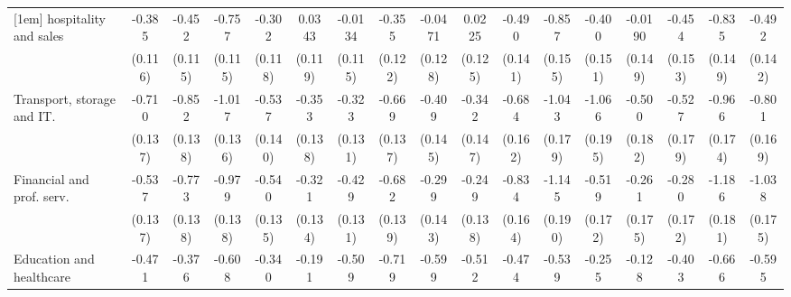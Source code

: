 {\begin{tabular}{l*{16}{c}}
[1em]
hospitality and sales&      -0.385\sym{***}&      -0.452\sym{***}&      -0.757\sym{***}&      -0.302\sym{*}  &      0.0343         &     -0.0134         &      -0.355\sym{**} &     -0.0471         &      0.0225         &      -0.490\sym{***}&      -0.857\sym{***}&      -0.400\sym{**} &     -0.0190         &      -0.454\sym{**} &      -0.835\sym{***}&      -0.492\sym{***}\\
                    &     (0.116)         &     (0.115)         &     (0.115)         &     (0.118)         &     (0.119)         &     (0.115)         &     (0.122)         &     (0.128)         &     (0.125)         &     (0.141)         &     (0.155)         &     (0.151)         &     (0.149)         &     (0.153)         &     (0.149)         &     (0.142)         \\
[1em]
Transport, storage and IT.&      -0.710\sym{***}&      -0.852\sym{***}&      -1.017\sym{***}&      -0.537\sym{***}&      -0.353\sym{*}  &      -0.323\sym{*}  &      -0.669\sym{***}&      -0.409\sym{**} &      -0.342\sym{*}  &      -0.684\sym{***}&      -1.043\sym{***}&      -1.066\sym{***}&      -0.500\sym{**} &      -0.527\sym{**} &      -0.966\sym{***}&      -0.801\sym{***}\\
                    &     (0.137)         &     (0.138)         &     (0.136)         &     (0.140)         &     (0.138)         &     (0.131)         &     (0.137)         &     (0.145)         &     (0.147)         &     (0.162)         &     (0.179)         &     (0.195)         &     (0.182)         &     (0.179)         &     (0.174)         &     (0.169)         \\
[1em]
Financial and prof. serv.&      -0.537\sym{***}&      -0.773\sym{***}&      -0.979\sym{***}&      -0.540\sym{***}&      -0.321\sym{*}  &      -0.429\sym{**} &      -0.682\sym{***}&      -0.299\sym{*}  &      -0.249         &      -0.834\sym{***}&      -1.145\sym{***}&      -0.519\sym{**} &      -0.261         &      -0.280         &      -1.186\sym{***}&      -1.038\sym{***}\\
                    &     (0.137)         &     (0.138)         &     (0.138)         &     (0.135)         &     (0.134)         &     (0.131)         &     (0.139)         &     (0.143)         &     (0.138)         &     (0.164)         &     (0.190)         &     (0.172)         &     (0.175)         &     (0.172)         &     (0.181)         &     (0.175)         \\
[1em]
Education and healthcare&      -0.471\sym{***}&      -0.376\sym{**} &      -0.608\sym{***}&      -0.340\sym{*}  &      -0.191         &      -0.509\sym{***}&      -0.719\sym{***}&      -0.599\sym{***}&      -0.512\sym{***}&      -0.474\sym{**} &      -0.539\sym{**} &      -0.255         &      -0.128         &      -0.403\sym{*}  &      -0.666\sym{***}&      -0.595\sym{***}\\

\end{tabular}}
